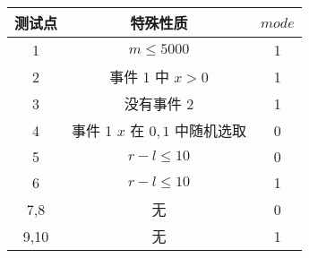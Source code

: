 \begin{table}[htbp]
    \centering
    \begin{tabular}{ccc}
        \toprule
        测试点 & 特殊性质                       & $mode$ \\
        \midrule
        1      & $m \le 5000$                   & 1      \\
        2      & 事件 1 中 $x > 0$              & 1      \\
        3      & 没有事件 2                     & 1      \\
        4      & 事件 1 $x$ 在 $0,1$ 中随机选取 & 0      \\
        5      & $r-l\le 10$                    & 0      \\
        6      & $r-l\le 10$                    & 1      \\
        7,8    & 无                             & 0      \\
        9,10   & 无                             & 1      \\
        \bottomrule
    \end{tabular}
\end{table}